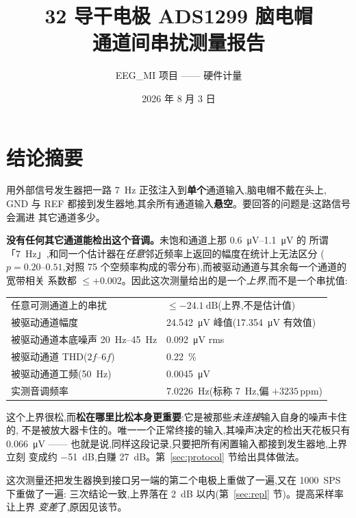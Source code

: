 \documentclass[11pt]{ctexart}
\title{\bfseries 32 导干电极 ADS1299 脑电帽\\通道间串扰测量报告}
\author{EEG\_MI 项目 —— 硬件计量}
\date{2026 年 8 月 3 日}
\begin{document}
\maketitle

\section*{结论摘要}

用外部信号发生器把一路 \SI{7}{\hertz} 正弦注入到\textbf{单个}通道输入,脑电帽不戴在头上,
GND 与 REF 都接到发生器地,其余所有通道输入\textbf{悬空}。要回答的问题是:这路信号会漏进
其它通道多少。

\textbf{没有任何其它通道能检出这个音调。}未饱和通道上那 \SIrange{0.6}{1.1}{\micro\volt} 的
所谓「\SI{7}{\hertz}」,和同一个估计器在\emph{任意}邻近频率上返回的幅度在统计上无法区分
($p = 0.20$–$0.51$,对照 75 个空频率构成的零分布),而被驱动通道与其余每一个通道的宽带相关
系数都 $\le +0.002$。因此这次测量给出的是一个\emph{上界},而不是一个串扰值:

\begin{center}
\begin{tabular}{ll}
\toprule
任意可测通道上的串扰 & $\le \SI{-24.1}{\deci\bel}$(上界,不是估计值) \\
被驱动通道幅度 & \SI{24.542}{\micro\volt} 峰值(\SI{17.354}{\micro\volt} 有效值) \\
被驱动通道本底噪声 \SIrange{20}{45}{\hertz} & \SI{0.092}{\micro\volt} rms \\
被驱动通道 THD($2f$–$6f$) & \SI{0.22}{\percent} \\
被驱动通道工频(\SI{50}{\hertz}) & \SI{0.0045}{\micro\volt} \\
实测音调频率 & \SI{7.0226}{\hertz}(标称 \SI{7}{\hertz},偏 $+3235$\,ppm) \\
\bottomrule
\end{tabular}
\end{center}

这个上界很松,而\textbf{松在哪里比松本身更重要}:它是被那些\emph{未连接}输入自身的噪声卡住的,
不是被放大器卡住的。唯一一个正常终接的输入,其噪声决定的检出天花板只有
\SI{0.066}{\micro\volt} —— 也就是说,同样这段记录,只要把所有闲置输入都接到发生器地,上界立刻
变成约 \SI{-51}{\deci\bel},白赚 \SI{27}{\deci\bel}。第~\ref{sec:protocol} 节给出具体做法。

这次测量还把发生器换到接口另一端的第二个电极上重做了一遍,又在 \SI{1000}{SPS} 下重做了一遍:
三次结论一致,上界落在 \SI{2}{\deci\bel} 以内(第~\ref{sec:repl} 节)。提高采样率让上界
\emph{变差}了,原因见该节。
\end{document}
